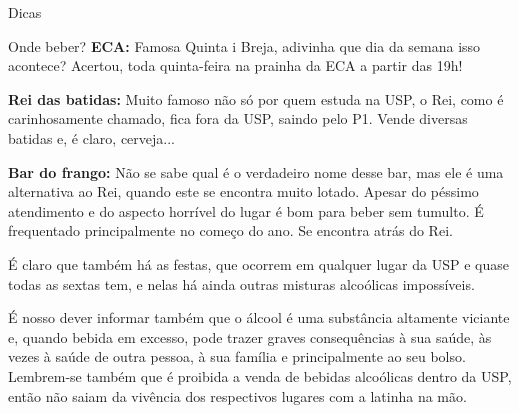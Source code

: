 \begin{secao}{Dicas}
\begin{subsecao}{Onde beber?}
{\bf ECA:} Famosa Quinta i Breja, adivinha que dia da semana isso acontece?
Acertou, toda quinta-feira na prainha da ECA a partir das 19h!

{\bf Rei das batidas:} Muito famoso não só por quem estuda na USP, o Rei,
como é carinhosamente chamado, fica fora da USP, saindo pelo P1. Vende
diversas batidas e, é claro, cerveja...

{\bf Bar do frango:} Não se sabe qual é o verdadeiro nome desse bar, mas ele é
uma alternativa ao Rei, quando este se encontra muito lotado. Apesar do péssimo atendimento e do aspecto horrível do lugar é bom para beber sem
tumulto. É frequentado principalmente no começo do ano. Se encontra atrás do
Rei.

É claro que também há as festas, que ocorrem em qualquer lugar da USP e quase todas as sextas tem, e nelas
há ainda outras misturas alcoólicas impossíveis.

É nosso dever informar também que o álcool é uma substância altamente viciante
e, quando bebida em excesso, pode trazer graves consequências à sua saúde, às
vezes à saúde de outra pessoa, à sua família e principalmente ao seu bolso.
Lembrem-se também que é proibida a venda de bebidas alcoólicas dentro da USP, então
não saiam da vivência dos respectivos lugares com a latinha na mão.

\end{subsecao}
\end{secao}

